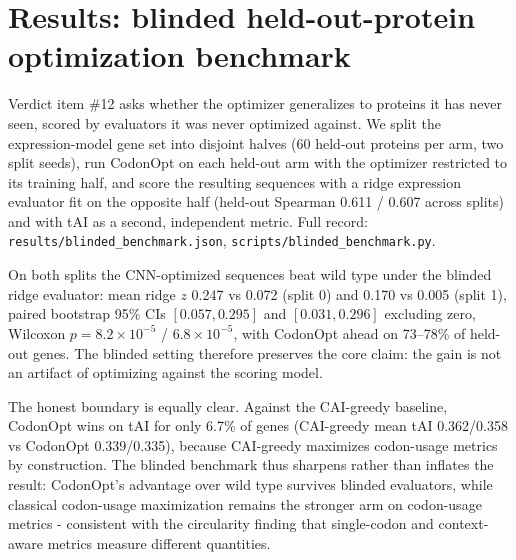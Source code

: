 \documentclass[11pt]{article}
\begin{document}
\section{Results: blinded held-out-protein optimization benchmark}
\label{sec:blinded}
Verdict item \#12 asks whether the optimizer generalizes to proteins it has never seen,
scored by evaluators it was never optimized against. We split the expression-model gene
set into disjoint halves (60 held-out proteins per arm, two split seeds), run CodonOpt
on each held-out arm with the optimizer restricted to its training half, and score the
resulting sequences with a ridge expression evaluator fit on the opposite half (held-out
Spearman 0.611 / 0.607 across splits) and with tAI as a second, independent metric.
Full record: \texttt{results/blinded\_benchmark.json}, \texttt{scripts/blinded\_benchmark.py}.

On both splits the CNN-optimized sequences beat wild type under the blinded ridge
evaluator: mean ridge $z$ 0.247 vs 0.072 (split 0) and 0.170 vs 0.005 (split 1),
paired bootstrap 95\% CIs $[0.057, 0.295]$ and $[0.031, 0.296]$ excluding zero,
Wilcoxon $p = 8.2\times10^{-5}$ / $6.8\times10^{-5}$, with CodonOpt ahead on
73--78\% of held-out genes. The blinded setting therefore preserves the core claim:
the gain is not an artifact of optimizing against the scoring model.

The honest boundary is equally clear. Against the CAI-greedy baseline, CodonOpt wins on
tAI for only 6.7\% of genes (CAI-greedy mean tAI 0.362/0.358 vs CodonOpt 0.339/0.335),
because CAI-greedy maximizes codon-usage metrics by construction. The blinded benchmark
thus sharpens rather than inflates the result: CodonOpt's advantage over wild type
survives blinded evaluators, while classical codon-usage maximization remains the
stronger arm on codon-usage metrics - consistent with the circularity finding that
single-codon and context-aware metrics measure different quantities.
\end{document}
